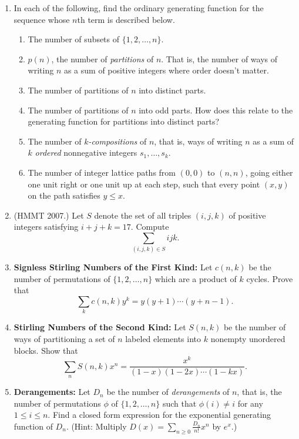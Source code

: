 \documentclass[11pt]{article}
\theoremstyle{definition}
\begin{document}
\begin{enumerate}
\item In each of the following, find the ordinary generating function for the sequence whose $n$th term is described below.
   \begin{enumerate}
     \item The number of subsets of $\{1,2,\ldots,n\}$.
     \item $p(n)$, the number of \textit{partitions} of $n$.  That is, the number of ways of writing $n$ as a sum of positive integers where order doesn't matter.
     \item The number of partitions of $n$ into distinct parts.
     \item The number of partitions of $n$ into odd parts.  How does this relate to the generating function for partitions into distinct parts?
     \item The number of \textit{$k$-compositions} of $n$, that is, ways of writing $n$ as a sum of $k$ \textit{ordered} nonnegative integers $s_1,\ldots,s_k$.
     \item The number of integer lattice paths from $(0,0)$ to $(n,n)$, going either one unit right or one unit up at each step, such that every point $(x,y)$ on the path satisfies $y\le x$.
   \end{enumerate}

\item (HMMT 2007.)  Let $S$ denote the set of all triples $(i,j,k)$ of positive integers satisfying $i+j+k=17$.  Compute $$\sum_{(i,j,k)\in S} ijk.$$

\item \textbf{Signless Stirling Numbers of the First Kind:} Let $c(n,k)$ be the number of permutations of $\{1,2,\ldots,n\}$ which are a product of $k$ cycles.  Prove that $$\sum_{k}c(n,k)y^k=y(y+1)\cdots(y+n-1).$$

\item \textbf{Stirling Numbers of the Second Kind:} Let $S(n,k)$ be the number of ways of partitioning a set of $n$ labeled elements into $k$ nonempty unordered blocks. Show that $$\sum_{n} S(n,k)x^n=\frac{x^k}{(1-x)(1-2x)\cdots (1-kx)}.$$

\item \textbf{Derangements:} Let $D_n$ be the number of \textit{derangements} of $n$, that is, the number of permutations $\phi$ of $\{1,2,\ldots,n\}$ such that $\phi(i)\neq i$ for any $1\le i \le n$.  Find a closed form expression for the exponential generating function of $D_n$.  (Hint: Multiply $D(x)=\sum_{n\ge 0} \frac{D_n}{n!} x^n$ by $e^x$.)

\end{enumerate}
\end{document}
